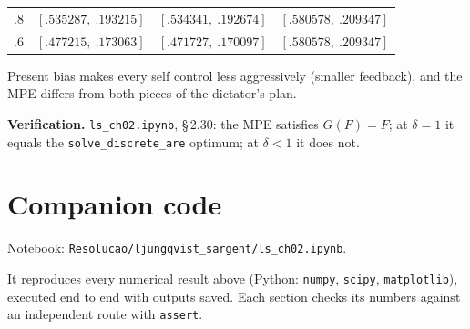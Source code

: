 \documentclass[12pt, letterpaper]{article}
\newcommand{\nb}[1]{\texttt{ls\_ch02.ipynb}, \S\,#1}
\begin{document}
\begin{tcolorbox}[evenbox,title={Exercise 2.30 \quad Phelps and Pollak (1968) Meet Howard}]
\begin{enumerate}
\begin{center}
\begin{tabular}{@{}lccc@{}}
.8 & $[.535287,\ .193215]$ & $[.534341,\ .192674]$ & $[.580578,\ .209347]$\\
.6 & $[.477215,\ .173063]$ & $[.471727,\ .170097]$ & $[.580578,\ .209347]$\\
\bottomrule
\end{tabular}
\end{center}
Present bias makes every self control less aggressively (smaller feedback), and the MPE differs from
both pieces of the dictator's plan.
\end{enumerate}

\textbf{Verification.} \nb{2.30}: the MPE satisfies $G(F)=F$; at $\delta=1$ it equals the
\texttt{solve\_discrete\_are} optimum; at $\delta<1$ it does not. \checkmark
\end{tcolorbox}

\section*{Companion code}

Notebook: \texttt{Resolucao/ljungqvist\_sargent/ls\_ch02.ipynb}.

It reproduces every numerical result above (Python: \texttt{numpy}, \texttt{scipy}, \texttt{matplotlib}), executed end to end with outputs saved. Each
section checks its numbers against an independent route with \texttt{assert}.
\end{document}
